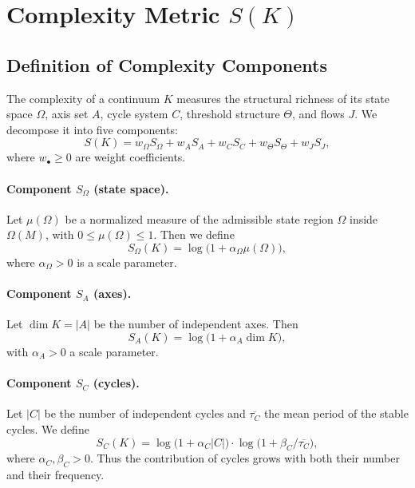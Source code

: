 \section{Complexity Metric \(S(K)\)}
\label{sec:complexity-S}

\subsection{Definition of Complexity Components}

The complexity of a continuum \(K\) measures the structural richness of its state space \(\Omega\), axis set \(A\), cycle system \(C\), threshold structure \(\Theta\), and flows \(J\).
We decompose it into five components:
\[
  S(K)=w_\Omega S_\Omega + w_A S_A + w_C S_C + w_\Theta S_\Theta + w_J S_J,
\]
where \(w_\bullet\ge 0\) are weight coefficients.

\paragraph{Component \texorpdfstring{\(S_\Omega\)}{S_\Omega} (state space).}
Let \(\mu(\Omega)\) be a normalized measure of the admissible state region \(\Omega\) inside \(\Omega(M)\), with \(0\le\mu(\Omega)\le 1\).
Then we define
\[
  S_\Omega(K) = \log\bigl(1+\alpha_\Omega \mu(\Omega)\bigr),
\]
where \(\alpha_\Omega>0\) is a scale parameter.

\paragraph{Component \texorpdfstring{\(S_A\)}{S_A} (axes).}
Let \(\dim K = |A|\) be the number of independent axes.
Then
\[
  S_A(K) = \log\bigl(1+\alpha_A \dim K\bigr),
\]
with \(\alpha_A>0\) a scale parameter.

\paragraph{Component \texorpdfstring{\(S_C\)}{S_C} (cycles).}
Let \(|C|\) be the number of independent cycles and \(\overline{\tau_C}\) the mean period of the stable cycles.
We define
\[
  S_C(K) = \log\bigl(1+\alpha_C |C|\bigr)\cdot \log\bigl(1+\beta_C/\overline{\tau_C}\bigr),
\]
where \(\alpha_C,\beta_C>0\).
Thus the contribution of cycles grows with both their number and their frequency.

